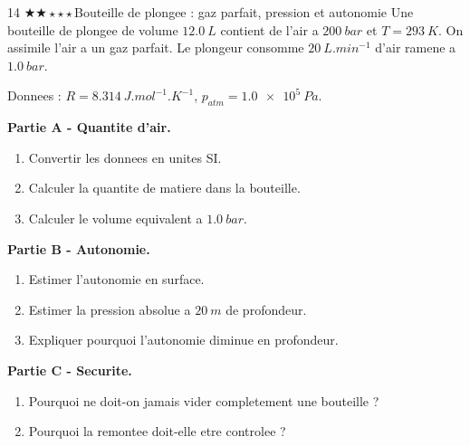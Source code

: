 \documentclass[11pt,a4paper]{article}
\newcommand{\difftwo}{\(\bigstar\bigstar\star\star\star\)}
\begin{document}
\begin{probleme}{14 \difftwo}{Bouteille de plongee : gaz parfait, pression et autonomie}
Une bouteille de plongee de volume \(\SI{12.0}{L}\) contient de l'air a \(\SI{200}{bar}\) et \(T=\SI{293}{K}\). On assimile l'air a un gaz parfait. Le plongeur consomme \(\SI{20}{L.min^{-1}}\) d'air ramene a \(\SI{1.0}{bar}\).

Donnees : \(R=\SI{8.314}{J.mol^{-1}.K^{-1}}\), \(p_{atm}=\SI{1.0e5}{Pa}\).

\textbf{Partie A - Quantite d'air.}
\begin{enumerate}
\item Convertir les donnees en unites SI.
\item Calculer la quantite de matiere dans la bouteille.
\item Calculer le volume equivalent a \(\SI{1.0}{bar}\).
\end{enumerate}

\textbf{Partie B - Autonomie.}
\begin{enumerate}[resume]
\item Estimer l'autonomie en surface.
\item Estimer la pression absolue a \(\SI{20}{m}\) de profondeur.
\item Expliquer pourquoi l'autonomie diminue en profondeur.
\end{enumerate}

\textbf{Partie C - Securite.}
\begin{enumerate}[resume]
\item Pourquoi ne doit-on jamais vider completement une bouteille ?
\item Pourquoi la remontee doit-elle etre controlee ?
\end{enumerate}
\end{probleme}
\end{document}
